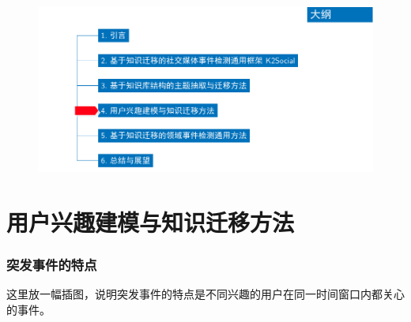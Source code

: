 \begin{withoutheadline}
\begin{frame}
\vspace*{-13mm}
\begin{figure}
	\hspace*{-4.2mm}
    \includegraphics[width=1.0\paperwidth]{img/contents4_output.pdf}
\end{figure}

\end{frame}
\end{withoutheadline}

\section{用户兴趣建模与知识迁移方法}

%

\begin{frame}
\frametitle{突发事件的特点}
这里放一幅插图，说明突发事件的特点是不同兴趣的用户在同一时间窗口内都关心的事件。
\end{frame}

